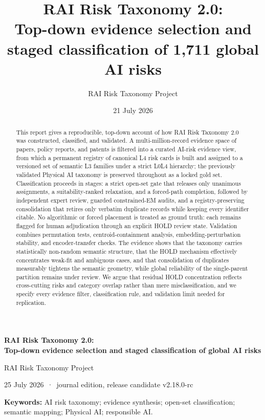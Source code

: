 \documentclass[11pt,a4paper]{article}
\title{\vspace{-1.3cm}\bfseries\Large RAI Risk Taxonomy 2.0:\\[3pt]
Top-down evidence selection and staged classification of 1,711 global AI risks}
\author{RAI Risk Taxonomy Project}
\date{21 July 2026}
\begin{document}
\begin{center}
{\LARGE\bfseries RAI Risk Taxonomy 2.0:\\[2pt]
Top-down evidence selection and staged classification of global AI risks\par}
\vspace{8pt}
{\large RAI Risk Taxonomy Project\par}
\vspace{2pt}
25 July 2026 \,·\, journal edition, release candidate v2.18.0-rc
\end{center}

\begin{abstract}
\noindent
This report gives a reproducible, top-down account of how RAI Risk Taxonomy
2.0 was constructed, classified, and validated. A multi-million-record
evidence space of papers, policy reports, and patents is filtered into a
curated AI-risk evidence view, from which a permanent registry of canonical L4
risk cards is built and assigned to a versioned set of semantic L3 families under
a strict L0\textendash{}L4 hierarchy; the previously validated Physical AI taxonomy is
preserved throughout as a locked gold set. Classification proceeds in stages:
a strict open-set gate that releases only unanimous assignments, a
suitability-ranked relaxation, and a forced-path completion, followed by
independent expert review, guarded constrained-EM audits, and a
registry-preserving consolidation that retires only verbatim duplicate
records while keeping every identifier citable. No algorithmic or forced
placement is treated as ground truth: each remains flagged for human
adjudication through an explicit HOLD review state. Validation combines
permutation tests, centroid-containment analysis, embedding-perturbation
stability, and encoder-transfer checks. The evidence shows that the taxonomy
carries statistically non-random semantic structure, that the HOLD mechanism
effectively concentrates weak-fit and ambiguous cases, and that consolidation
of duplicates measurably tightens the semantic geometry, while global
reliability of the single-parent partition remains under review. We argue
that residual HOLD concentration reflects cross-cutting risks and category
overlap rather than mere misclassification, and we specify every evidence
filter, classification rule, and validation limit needed for replication.
\end{abstract}

\noindent\textbf{Keywords:} AI risk taxonomy; evidence synthesis; open-set
classification; semantic mapping; Physical AI; responsible AI.
\end{document}
